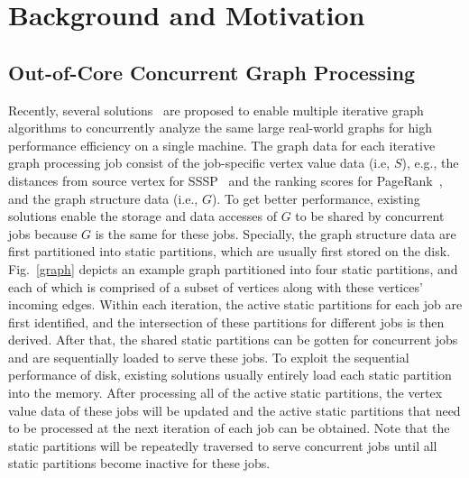 \documentclass[10pt,journal,compsoc]{IEEEtran}
\begin{document}
\vspace{-10pt}
\section{Background and Motivation}\label{sec:2}

\vspace{-2pt}
\subsection{Out-of-Core Concurrent Graph Processing}
\vspace{-2pt}
Recently, several solutions~\cite{CGraph,GraphM} are proposed to enable multiple iterative graph algorithms to concurrently analyze the same large real-world graphs for high performance efficiency on a single machine.
The graph data for each iterative graph processing job consist of the job-specific vertex value data (i.e, $S$), e.g., the distances from source vertex for SSSP~\cite{SSSP} and the ranking scores for PageRank~\cite{PageRank}, and the graph structure data (i.e., $G$).
To get better performance, existing solutions enable the storage and data accesses of $G$ to be shared by concurrent jobs because $G$ is the same for these jobs. Specially, the graph structure data are first partitioned into static partitions, which are usually first stored on the disk.
Fig.~\ref{graph} depicts an example graph partitioned into four static partitions, and each of which is comprised of a subset of vertices along with these vertices' incoming edges.
Within each iteration, the active static partitions for each job are first identified, and the intersection of these partitions for different jobs is then derived.
After that, the shared static partitions can be gotten for concurrent jobs and are sequentially loaded to serve these jobs. To exploit the sequential performance of disk, existing solutions usually entirely load each static partition into the memory. After processing all of the active static partitions, the vertex value data of these jobs will be updated and the active static partitions that need to be processed at the next iteration of each job can be obtained. Note that the static partitions will be repeatedly traversed to serve concurrent jobs until all static partitions become inactive for these jobs.
\end{document}
